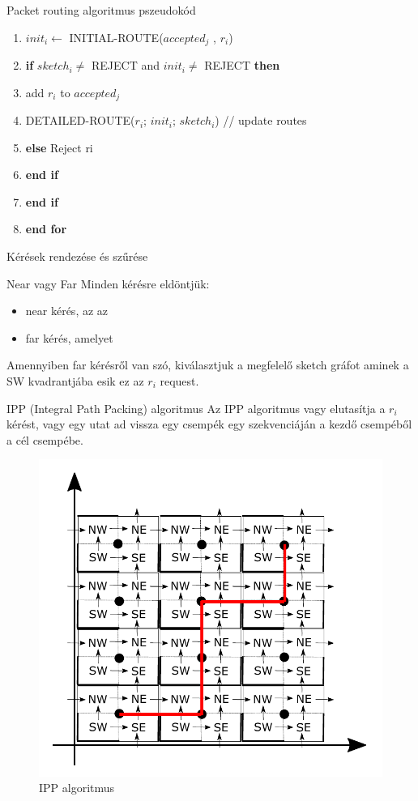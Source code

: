 \documentclass[10pt]{beamer}
\begin{document}
\begin{frame}{Packet routing algoritmus pszeudokód}
  \begin{enumerate}
  	\setcounter{enumi}{\theenumTemp}
  	\item \quad \quad $ init_i \leftarrow $ INITIAL-ROUTE($ accepted_j $ , $ r_i $)
  	\item \quad \quad \textbf{if} $ sketch_i \neq $ REJECT and $ init_i \neq $ REJECT \textbf{then}
	\item \quad \quad \quad add $ r_i $ to $ accepted_j $
	\item \quad \quad \quad DETAILED-ROUTE($ r_i $; $ init_i $; $ sketch_i $) // update routes
	\item \quad \quad \textbf{else} Reject ri
	\item \quad \quad \textbf{end if}
	\item \quad \textbf{end if}
	\item \textbf{end for}
  \end{enumerate}
\end{frame}

\begin{frame}{Kérések rendezése és szűrése}
\end{frame}

\begin{frame}{Near vagy Far}
  Minden kérésre eldöntjük:
  \begin{itemize}
  	\item near kérés, az az 
  	\item far kérés, amelyet
  \end{itemize}
  Amennyiben far kérésről van szó, kiválasztjuk a megfelelő sketch gráfot aminek a SW kvadrantjába esik ez az $ r_i $ request.
\end{frame}

\begin{frame}{IPP (Integral Path Packing) algoritmus}
	Az IPP algoritmus \cite{buchbinder2006improved} vagy elutasítja a $ r_i $ kérést, vagy egy utat ad vissza egy csempék egy szekvenciáján a kezdő csempéből a cél csempébe.
	\begin{figure}
		\centering \includegraphics[width=0.55\columnwidth]{Image/ipp}
		\caption{\label{fig:ipp}IPP algoritmus}
	\end{figure}
\end{frame}
\end{document}
